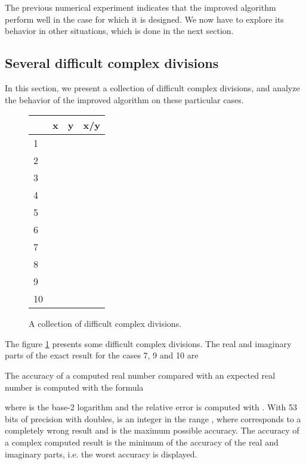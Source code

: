 \documentclass{paper}
\begin{document}
The previous numerical experiment indicates that the improved 
algorithm perform well in the case for which it is designed. 
We now have to explore its behavior in other situations, which 
is done in the next section. 


\subsection{Several difficult complex divisions}
\label{section-difficultcases}

In this section, we present a collection of difficult complex 
divisions, and analyze the behavior of the improved algorithm 
on these particular cases. 

\begin{figure}
\caption{A collection of difficult complex divisions.}
\label{fig-compdiv-diffcasespres}
\begin{center}
\begin{tabular}{l|lll@{}}
  & x & y & x/y \\
\hline
1 &                    &             & \\
2 &                    &    &  \\
3 &   &       &  \\
4 &    &                      &  \\
5 &    &       &  \\
6 &   &  &  \\
7 &     &    &  \\
8 &  &    &  \\
9 &    &      &  \\
10&   &      & 
\end{tabular}
\end{center}
\end{figure}

The figure \ref{fig-compdiv-diffcasespres} presents some difficult complex divisions. 
The real and imaginary parts of the exact result for the cases 7, 9 and 10 are


The accuracy  of a computed real number compared 
with an expected real number is computed with the formula 

where  is the base-2 logarithm and 
the relative error is computed with  
.
With 53 bits of precision with doubles,  is an integer  
in the range , where  corresponds to a 
completely wrong result and  is the maximum 
possible accuracy. 
The accuracy of a complex computed result is the minimum of the 
accuracy of the real and imaginary parts, i.e. the worst 
accuracy is displayed. 
\end{document}
